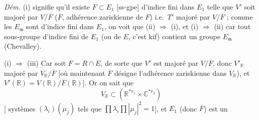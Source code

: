 \documentclass[11pt,a4paper]{article}
\begin{document}
\emph{Dém.} (i) signifie qu'il existe $F \subset E_{1}$ [ss-gpe] d'indice fini
dans $E_{1}$ telle que $V'$ soit majoré par $V/\overline{F}$ ($\overline{F}$,
adhérence zariskienne de $F$) i.e.\ $T'$ majoré par $V/\overline{F}$ ; comme
les $E_{\mathfrak{m}}$ sont d'indice fini dans $E_{1}$, on voit que (ii)
$\Rightarrow$ (i), et (i) $\Rightarrow$ (ii) car tout sous-groupe
d'indice fini de $E_{1}$  (ou de $E$, c'est kif) contient un
groupe $E_{\mathfrak{m}}$ (Chevalley).

(i) $\Longrightarrow$ (iii) Car soit $F = R \cap E$, de sorte que $V'$ est
majoré par $V/\overline{F}$, donc $V'_{\mathbb{R}}$ majoré par
$V_{\mathbb{R}}/\overline{F}$ [où maintenant $\overline{F}$ désigne
l'adhérence zariskienne dans $V_{\mathbb{R}}$), et $V'(\mathbb{R}) =
V(\mathbb{R})/\overline{F}(\mathbb{R})$]. Or on sait que
\[
  V_{\mathbb{R}} \subset (\mathbb{R}^{*r_{1}} \times \mathbb{C}^{*r_{2}})
\]
\ill{} [ systèmes $(\lambda_{i})(\mu_{j})$ tels que
$\prod \lambda_{i} \prod |\mu_{j}|^{2} = 1$], et $E_{1}$ (donc $F$) est un
\end{document}
